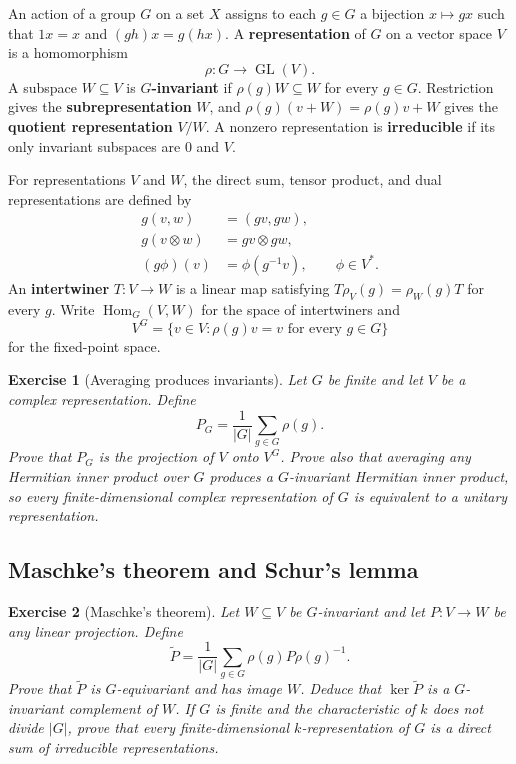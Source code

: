 \documentclass{article}
\newtheorem{exercise}{Exercise}
\begin{document}
An action of a group $G$ on a set $X$ assigns to each $g\in G$ a bijection $x\mapsto gx$ such that $1x=x$ and $(gh)x=g(hx)$. A \textbf{representation} of $G$ on a vector space $V$ is a homomorphism
\[
\rho:G\longrightarrow\operatorname{GL}(V).
\]
A subspace $W\subseteq V$ is \textbf{$G$-invariant} if $\rho(g)W\subseteq W$ for every $g\in G$. Restriction gives the \textbf{subrepresentation} $W$, and $\rho(g)(v+W)=\rho(g)v+W$ gives the \textbf{quotient representation} $V/W$. A nonzero representation is \textbf{irreducible} if its only invariant subspaces are $0$ and $V$.

For representations $V$ and $W$, the direct sum, tensor product, and dual representations are defined by
\[
\begin{aligned}
g(v,w)&=(gv,gw),\\
g(v\otimes w)&=gv\otimes gw,\\
(g\phi)(v)&=\phi(g^{-1}v),\qquad \phi\in V^*.
\end{aligned}
\]
An \textbf{intertwiner} $T:V\to W$ is a linear map satisfying $T\rho_V(g)=\rho_W(g)T$ for every $g$. Write $\operatorname{Hom}_G(V,W)$ for the space of intertwiners and
\[
V^G=\{v\in V:\rho(g)v=v\text{ for every }g\in G\}
\]
for the fixed-point space.

\begin{exercise}[Averaging produces invariants]\leavevmode\par
\textit{Let $G$ be finite and let $V$ be a complex representation. Define}
\[
P_G=\frac1{|G|}\sum_{g\in G}\rho(g).
\]
\textit{Prove that $P_G$ is the projection of $V$ onto $V^G$. Prove also that averaging any Hermitian inner product over $G$ produces a $G$-invariant Hermitian inner product, so every finite-dimensional complex representation of $G$ is equivalent to a unitary representation.}
\end{exercise}

\subsection{Maschke's theorem and Schur's lemma}

\begin{exercise}[Maschke's theorem]\leavevmode\par
\textit{Let $W\subseteq V$ be $G$-invariant and let $P:V\to W$ be any linear projection. Define}
\[
\widetilde P
=\frac1{|G|}\sum_{g\in G}\rho(g)P\rho(g)^{-1}.
\]
\textit{Prove that $\widetilde P$ is $G$-equivariant and has image $W$. Deduce that $\ker\widetilde P$ is a $G$-invariant complement of $W$. If $G$ is finite and the characteristic of $k$ does not divide $|G|$, prove that every finite-dimensional $k$-representation of $G$ is a direct sum of irreducible representations.}
\end{exercise}
\end{document}
